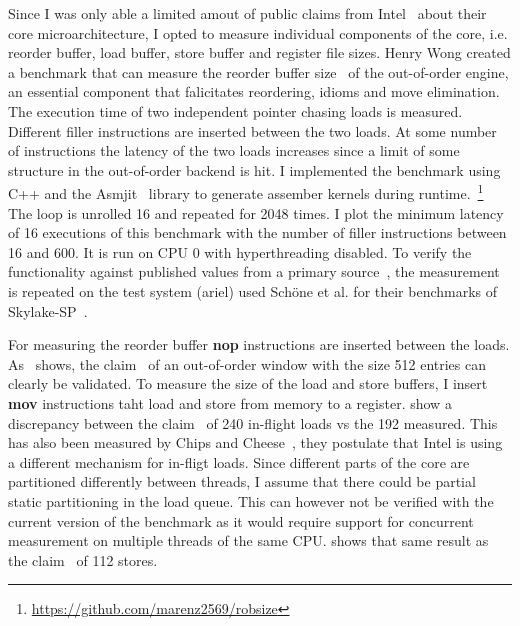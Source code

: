 Since I was only able a limited amout of public claims from Intel~\cite{Intel_2021_Architecture_Day} about their core microarchitecture, I opted to measure individual components of the core, i.e. reorder buffer, load buffer, store buffer and register file sizes.
Henry Wong created a benchmark that can measure the reorder buffer size~\cite{Wong_2013_robsize} of the out-of-order engine, an essential component that falicitates reordering, idioms and move elimination.
The execution time of two independent pointer chasing loads is measured.
Different filler instructions are inserted between the two loads.
At some number of instructions the latency of the two loads increases since a limit of some structure in the out-of-order backend is hit.
I implemented the benchmark using C++ and the Asmjit~\cite{Kobalicek_AsmJit} library to generate assember kernels during runtime.~\footnote{\url{https://github.com/marenz2569/robsize}}
The loop is unrolled \SI{16}{} and repeated for \SI{2048}{} times.
I plot the minimum latency of \SI{16}{} executions of this benchmark with the number of filler instructions between \SI{16}{} and \SI{600}{}.
It is run on CPU 0 with hyperthreading disabled.
To verify the functionality against published values from a primary source~\cite{Intel_2020_Skylake_SP}, the measurement is repeated on the test system (ariel) used Schöne et al. for their benchmarks of Skylake-SP~\cite{Schoene_2019_SKL}.

For measuring the reorder buffer \textbf{nop} instructions are inserted between the loads.
As~ shows, the claim~\cite{ServerTheHome_2023_SPR_Press,Wccftech_2023_SPR_Press} of an out-of-order window with the size \SI{512}{} entries can clearly be validated.
To measure the size of the load and store buffers, I insert \textbf{mov} instructions taht load and store from memory to a register.
 show a discrepancy between the claim~\cite{ServerTheHome_2023_SPR_Press,Wccftech_2023_SPR_Press} of 240 in-flight loads vs the 192 measured.
This has also been measured by Chips and Cheese~\cite{Chipsandcheese_2023_GoldenCove_Vector_Register}, they postulate that Intel is using a different mechanism for in-fligt loads.
Since different parts of the core are partitioned differently between threads, I assume that there could be partial static partitioning in the load queue.
This can however not be verified with the current version of the benchmark as it would require support for concurrent measurement on multiple threads of the same CPU.
 shows that same result as the claim~\cite{ServerTheHome_2023_SPR_Press,Wccftech_2023_SPR_Press} of 112 stores.

